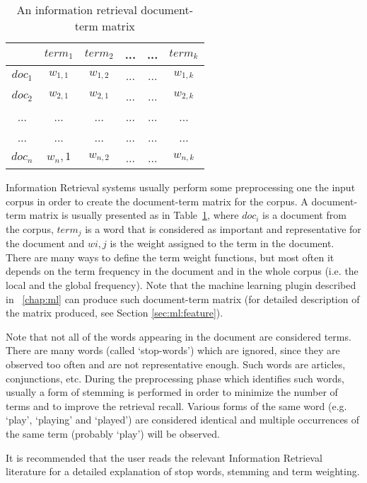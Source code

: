 \begin{table}
\begin{center}
\begin{tabular}{|c|c|c|c|c|c|}
\hline
& $term_1$ & $term_2$ & ... & ... & $term_k$\\
\hline
$doc_1$ & $w_{1,1}$ & $w_{1,2}$ & ... & ... & $w_{1,k}$\\
\hline
$doc_2$ & $w_{2,1}$ & $w_{2,1}$ & ... & ... & $w_{2,k}$\\
\hline
... & ... & ... & ... & ... & ... \\
\hline
... & ... & ... & ... & ... & ... \\
\hline
$doc_n$ & $w{_n,1}$ & $w_{n,2}$ & ... & ... & $w_{n,k}$\\
\hline
\end{tabular}
\caption{An information retrieval document-term matrix}
\label{table:matrix}
\end{center}
\end{table}



Information Retrieval systems usually perform some preprocessing one the input
corpus in order to create the document-term matrix for the corpus. A
document-term matrix is usually presented as in Table~\ref{table:matrix},
where $doc_i$ is a document from the corpus, $term_j$ is a word that is
considered as important and representative for the document and $wi,j$ is the
weight assigned to the term in the document. There are many ways to define the
term weight functions, but most often it depends on the term frequency in the
document and in the whole corpus (i.e. the local and the global
frequency). Note that the machine learning plugin described in
\Chapthing~\ref{chap:ml} can produce such document-term matrix (for detailed
description of the matrix produced, see Section \ref{sec:ml:feature}).

Note that not all of the words appearing in the document are
considered terms. There are many words (called `stop-words') which are
ignored, since they are observed too often and are not representative
enough. Such words are articles, conjunctions, etc. During the
preprocessing phase which identifies such words, usually a form of
stemming is performed in order to minimize the number of terms and to
improve the retrieval recall. Various forms of the same word
(e.g. `play', `playing' and `played') are considered identical and
multiple occurrences of the same term (probably `play') will be
observed.

It is recommended that the user reads the relevant Information
Retrieval literature for a detailed explanation of stop words,
stemming and term weighting.

